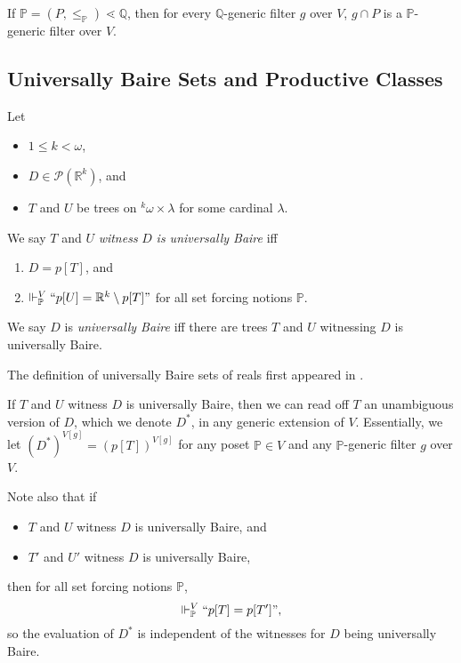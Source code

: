 \documentclass[12pt]{article}
\numberwithin{equation}{section}
\begin{document}
\begin{fact}\label{regsubo}
If $\mathbb{P} = (P, \leq_{\mathbb{P}}) \lessdot \mathbb{Q}$, then for every $\mathbb{Q}$-generic filter $g$ over $V$, $g \cap P$ is a $\mathbb{P}$-generic filter over $V$.
\end{fact}

\subsection{Universally Baire Sets and Productive Classes}\label{ss25}

\begin{defi}
Let 
\begin{itemize}
    \item $1 \leq k < \omega$, 
    \item $D \in \mathcal{P}(\mathbb{R}^k)$, and
    \item $T$ and $U$ be trees on ${^{k}{\omega}} \times \lambda$ for some cardinal $\lambda$.
\end{itemize} 
We say $T$ and $U$ \emph{witness} $D$ \emph{is universally Baire} iff 
\begin{enumerate}[label=(\alph*)]
    \item $D = p[T]$, and
    \item $\Vdash^V_{\mathbb{P}} ``p[U] = \mathbb{R}^k \setminus p[T]"$ for all set forcing notions $\mathbb{P}$.
\end{enumerate}
We say $D$ is \emph{universally Baire} iff there are trees $T$ and $U$ witnessing $D$ is universally Baire.
\end{defi}

The definition of universally Baire sets of reals first appeared in \cite[Section 2]{fmw}. 

If $T$ and $U$ witness $D$ is universally Baire, then we can read off $T$ an unambiguous version of $D$, which we denote $D^*$, in any generic extension of $V$. Essentially, we let $(D^*)^{V[g]} = (p[T])^{V[g]}$ for any poset $\mathbb{P} \in V$ and any $\mathbb{P}$-generic filter $g$ over $V$.

Note also that if
\begin{itemize}
    \item $T$ and $U$ witness $D$ is universally Baire, and
    \item $T'$ and $U'$ witness $D$ is universally Baire,
\end{itemize}
then for all set forcing notions $\mathbb{P}$, 
\begin{equation*}
    \Vdash^V_{\mathbb{P}} ``p[T] = p[T']",
\end{equation*}
so the evaluation of $D^*$ is independent of the witnesses for $D$ being universally Baire.
\end{document}
